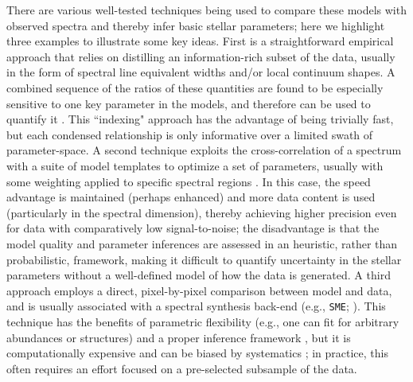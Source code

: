 \documentclass[iop,floatfix,numberedappendix,twocolappendix]{emulateapj}
\begin{document}
There are various well-tested techniques being used to compare these models with observed spectra
and thereby infer basic stellar parameters; here we highlight three examples to illustrate some key
ideas.  First is a straightforward empirical approach that relies on distilling an information-rich
subset of the data, usually in the form of spectral line equivalent widths and/or local continuum
shapes.  A combined sequence of the ratios of these quantities are found to be especially sensitive
to one key parameter in the models, and therefore can be used to quantify it \citep[e.g., {\tt
MOOG};][]{sneden73,gray94,reid95,rojas-ayala10,rojas-ayala12}.  This ``indexing" approach has the
advantage of being trivially fast, but each condensed relationship is only informative over a
limited swath of parameter-space.  A second technique exploits the cross-correlation of a spectrum
with a suite of model templates to optimize a set of parameters, usually with some weighting applied
to specific spectral regions \citep[e.g., {\tt SPC};][]{buchhave12}.  In this case, the speed
advantage is maintained (perhaps enhanced) and more data content is used (particularly in the
spectral dimension), thereby achieving higher precision even for data with comparatively low
signal-to-noise; the disadvantage is that the model quality and parameter inferences are assessed in
an heuristic, rather than probabilistic, framework, making it difficult to quantify uncertainty in
the stellar parameters without a well-defined model of how the data is generated.  A third approach
employs a direct, pixel-by-pixel comparison between model and data, and is usually associated with a
spectral synthesis back-end (e.g., {\tt SME}; \citealt{valenti96}).  This technique has the benefits
of parametric flexibility (e.g., one can fit for arbitrary abundances or structures) and a proper
inference framework \citep[usually a least-squares approach, although increasingly in a Bayesian
format;][]{shkedy07, schoenrich13}, but it is computationally expensive and can be biased by
systematics \citep[e.g.,][]{mann13}; in practice, this often requires an effort focused on a
pre-selected subsample of the data. 
\end{document}
